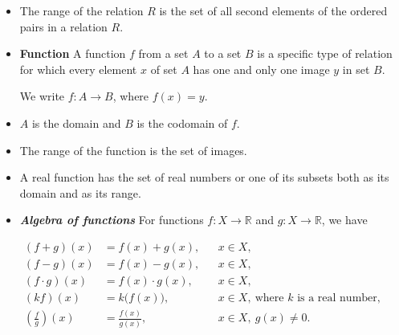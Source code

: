\documentclass[11pt]{article}
\begin{document}
\begin{mdframed}
\begin{itemize}[leftmargin=1.8em]
\item[$\diamond$] The range of the relation $R$ is the set of all second elements of
the ordered pairs in a relation $R$.

\item[$\diamond$] \textbf{Function}  
A function $f$ from a set $A$ to a set $B$ is a specific type of relation for which
every element $x$ of set $A$ has one and only one image $y$ in set $B$.

We write $f:A\to B$, where $f(x)=y$.

\item[$\diamond$] $A$ is the domain and $B$ is the codomain of $f$.

\item[$\diamond$] The range of the function is the set of images.

\item[$\diamond$] A real function has the set of real numbers or one of its subsets
both as its domain and as its range.

\item[$\diamond$] \textbf{\textit{Algebra of functions}}  
For functions $f:X\to\mathbb{R}$ and $g:X\to\mathbb{R}$, we have

\end{itemize}

\vspace{-6pt}

\[
\begin{aligned}
(f+g)(x) &= f(x)+g(x), && x\in X,\\[4pt]
(f-g)(x) &= f(x)-g(x), && x\in X,\\[4pt]
(f\cdot g)(x) &= f(x)\cdot g(x), && x\in X,\\[4pt]
(kf)(x) &= k\bigl(f(x)\bigr), && x\in X,\ \text{where } k \text{ is a real number},\\[6pt]
\left(\frac{f}{g}\right)(x) &= \frac{f(x)}{g(x)}, && x\in X,\ g(x)\neq 0.
\end{aligned}
\]

\end{mdframed}
\end{document}
